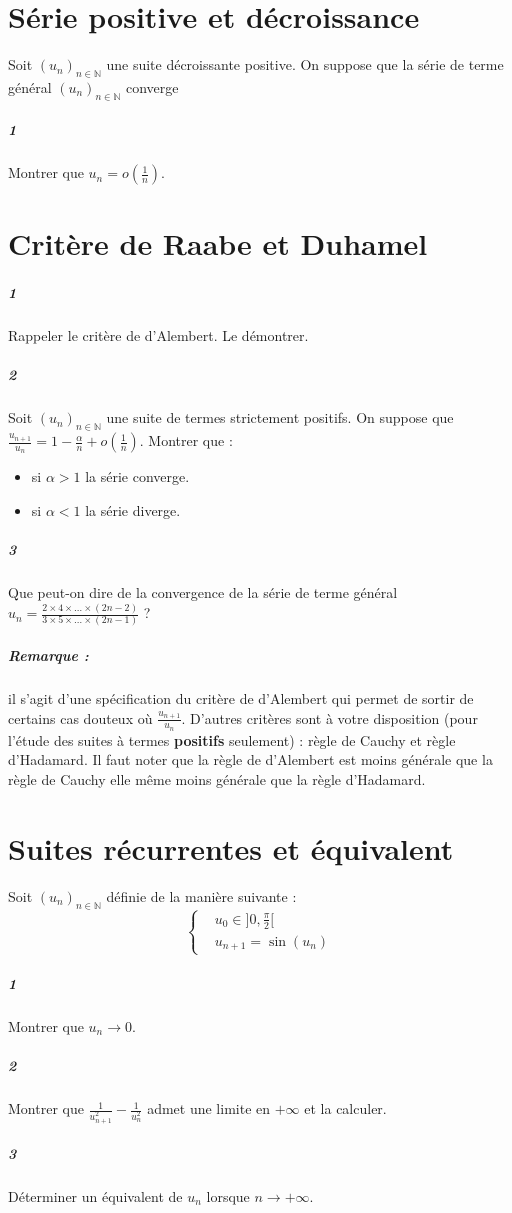 \documentclass[10pt,a4paper]{article}
\begin{document}
\section{Série positive et décroissance}
Soit $(u_n)_{n \in \mathbb{N}}$ une suite décroissante positive. On suppose que la série de terme général $(u_n)_{n \in \mathbb{N}}$ converge
\subparagraph{1}Montrer que $u_n = o(\frac{1}{n})$.

\section{Critère de Raabe et Duhamel}
\subparagraph{1}Rappeler le critère de d'Alembert. Le démontrer.
\subparagraph{2}Soit $(u_n)_{n \in \mathbb{N}}$ une suite de termes strictement positifs. On suppose que $\frac{u_{n+1}}{u_n} = 1- \frac{\alpha}{n}+ o \left(\frac{1}{n}\right)$. Montrer que :
\begin{itemize}
\item si $\alpha>1$ la série converge.
\item si $\alpha<1$ la série diverge.
\end{itemize}
\subparagraph{3}Que peut-on dire de la convergence de la série de terme général $u_n = \frac{2 \times 4 \times \dots \times (2n-2)}{3 \times 5 \times \dots \times (2n-1)}$ ?
\subparagraph{Remarque :} il s'agit d'une spécification du critère de d'Alembert qui permet de sortir de certains cas douteux où $\frac{u_{n+1}}{u_n}$. D'autres critères sont à votre disposition (pour l'étude des suites à termes \textbf{positifs} seulement) : règle de Cauchy et règle d'Hadamard. Il faut noter que la règle de d'Alembert est moins générale que la règle de Cauchy elle même moins générale que la règle d'Hadamard.

\section{Suites récurrentes et équivalent}
Soit $(u_n)_{n \in \mathbb{N}}$ définie de la manière suivante :
\begin{equation*}
\left\lbrace
\begin{aligned}
& u_0 \in ]0,\frac{\pi}{2}[\\
& u_{n+1}=\sin(u_n)
\end{aligned}
\right.
\end{equation*}
\subparagraph{1}Montrer que $u_n \rightarrow 0$.
\subparagraph{2}Montrer que $\frac{1}{u_{n+1}^2}-\frac{1}{u_n^2}$ admet une limite en $+\infty$ et la calculer.
\subparagraph{3}Déterminer un équivalent de $u_n$ lorsque $n \rightarrow +\infty$.
\end{document}
